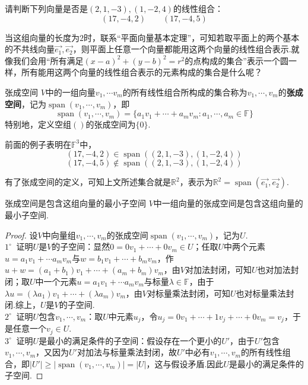 \documentclass[lang=cn, zihao=5]{elegantbook}
\newcommand{\xl}[1]{\overrightarrow{#1}}
\newcommand{\R}{\mathbb{R}}
\newcommand{\F}{\mathbb{F}}
\newcommand{\buzhou}[1]{$#1^{\circ} \ $}
\DeclareMathOperator{\spn}{span}
\begin{document}
\begin{example}
	请判断下列向量是否是$(2,1,-3),(1,-2,4)$的线性组合：
	$$(17,-4,2) \qquad (17,-4,5)$$
\end{example}

当这组向量的长度为$2$时，联系“平面向量基本定理”，可知若取平面上的两个基本的不共线向量$\xl{e_1},\xl{e_2}$，则平面上任意一个向量都能用这两个向量的线性组合表示.就像我们会用“所有满足$(x-a)^2+(y-b)^2=r^2$的点构成的集合”表示一个圆一样，所有能用这两个向量的线性组合表示的元素构成的集合是什么呢？

\begin{definition}{张成空间}
	$V$中的一组向量$v_1, \cdots v_m$的所有线性组合所构成的集合称为$v_1 , \cdots ,v_m$的\textbf{张成空间}，记为$\spn (v_1, \cdots ,v_m)$，即$$\spn (v_1, \cdots ,v_m) = \{ a_1v_1 + \cdots + a_mv_m : a_1 ,\cdots ,a_m \in \F \}$$
	特别地，定义空组$()$的张成空间为$\{ 0 \}$.
\end{definition}

\begin{example}
	前面的例子表明在$\F ^3$中，
	$$(17,-4,2) \in \spn ((2,1,-3),(1,-2,4))$$
	$$(17,-4,5) \notin \spn ((2,1,-3),(1,-2,4))$$
\end{example}

有了张成空间的定义，可知上文所述集合就是$\R ^2$，表示为$\R ^2 = \spn (\xl{e_1},\xl{e_2})$.

\begin{proposition}{张成空间是包含这组向量的最小子空间}
	$V$中一组向量的张成空间是包含这组向量的最小子空间.
\end{proposition}
\begin{proof}
	设$V$中向量组$v_1, \cdots ,v_m$的张成空间$\spn (v_1, \cdots ,v_m)$，记为$U$. \\
	\buzhou{1} 证明$U$是$V$的子空间：显然$0=0v_1 + \cdots + 0v_m \in U$；任取$U$中两个元素$u=a_1v_1 + \cdots a_mv_m$与$w=b_1v_1 + \cdots + b_mv_m$，作$u+w = (a_1+b_1)v_1 + \cdots + (a_m+b_m)v_m$，由$V$对加法封闭，可知$U$也对加法封闭；取$U$中一个元素$u=a_1v_1 + \cdots a_mv_m$与标量$\lambda \in \F$，由于$\lambda u = (\lambda a_1) v_1 + \cdots + (\lambda a_m)v_m$，由$V$对标量乘法封闭，可知$U$也对标量乘法封闭.综上，$U$是$V$的子空间.\\
    \buzhou{2} 证明$U$包含$v_1,\cdots ,v_m$：取$U$中元素$u_j$，令$u_j=0v_1 + \cdots + 1v_j + \cdots + 0v_m = v_j$，于是任意一个$v_j \in U$. \\
    \buzhou{3} 证明$U$是最小的满足条件的子空间：假设存在一个更小的$U'$，由于$U'$包含$v_1, \cdots ,v_m$，又因为$U'$对加法与标量乘法封闭，故$U'$中必有$v_1, \cdots ,v_m$的所有线性组合，即$|U'| \geq |\spn (v_1, \cdots ,v_m)| = |U|$，这与假设矛盾.因此$U$是最小的满足条件的子空间.
\end{proof}
\end{document}
